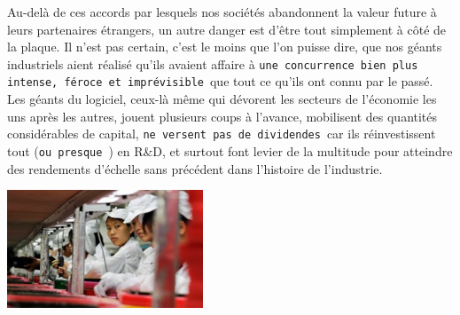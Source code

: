 \documentclass[11pt,twoside,a4paper]{article}
\begin{document}
\begin{minipage}[h]{12.00cm}
	Au-del{\`a} de ces accords par lesquels nos soci{\'e}t{\'e}s abandonnent la valeur future {\`a} leurs partenaires {\'e}trangers, un autre danger est d'{\^e}tre tout simplement {\`a} c{\^o}t{\'e} de la plaque. Il n'est pas certain, c'est le moins que l'on puisse dire, que nos g{\'e}ants industriels aient r{\'e}alis{\'e} qu'ils avaient affaire {\`a} \texttt{une concurrence bien plus intense, f{\'e}roce et impr{\'e}visible}~\footnotemark que tout ce qu'ils ont connu par le pass{\'e}. Les g{\'e}ants du logiciel, ceux-l{\`a} m{\^e}me qui d{\'e}vorent les secteurs de l'{\'e}conomie les uns apr{\`e}s les autres, jouent plusieurs coups {\`a} l'avance, mobilisent des quantit{\'e}s consid{\'e}rables de capital, \texttt{ne versent pas de dividendes}~\footnotemark car ils r{\'e}investissent tout (\texttt{ou presque}~\footnotemark) en R\&D, et surtout font levier de la multitude pour atteindre des rendements d'{\'e}chelle sans pr{\'e}c{\'e}dent dans l'histoire de l'industrie.
\end{minipage} \hfill \begin{minipage}[h]{6.00cm}
	\includegraphics[width=5.85cm]{img/Foxconn-factory-workers-i-008-300x180.jpg}
\end{minipage} ~\\~\\
\end{document}
